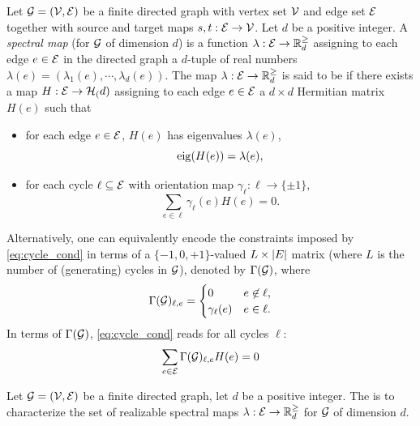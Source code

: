 \documentclass[notitlepage, 10pt]{article}
\begin{document}
\begin{defn}
    Let $\mathcal G = (\mathcal V, \mathcal E)$ be a finite directed graph with vertex set $\mathcal V$ and edge set $\mathcal E$ together with source and target maps $s, t : \mathcal E \to \mathcal V$.
    Let $d$ be a positive integer.
    A \textit{spectral map} (for $\mathcal G$ of dimension $d$) is a function $\lambda : \mathcal E \to \mathbb R^{\geq}_{d}$ assigning to each edge $e \in \mathcal E$ in the directed graph a $d$-tuple of real numbers $\lambda(e) = (\lambda_1(e), \cdots, \lambda_d(e))$.
    The map $\lambda : \mathcal E \to \mathbb R^{\geq}_{d}$ is said to be  if there exists a map $H : \mathcal E \to \mathcal H_{(}d)$ assigning to each edge $e \in \mathcal E$ a $d \times d$ Hermitian matrix $H(e)$ such that
    \begin{itemize}
        \item for each edge $e \in \mathcal E$, $H(e)$ has eigenvalues $\lambda(e)$, 
            \begin{equation}
                \label{eq:spec_cond}
                \operatorname{eig}(H(e)) = \lambda(e),
            \end{equation}
        \item for each cycle $\ell \subseteq \mathcal E$ with orientation map $\gamma_{\ell} : \ell \to \{\pm1\}$,
            \begin{equation}
                \label{eq:cycle_cond}
                \sum_{e \in \ell} \gamma_{\ell}(e)H(e) = 0.
            \end{equation}
    \end{itemize}
    Alternatively, one can equivalently encode the constraints imposed by \cref{eq:cycle_cond} in terms of a $\{-1, 0, +1\}$-valued $L \times \left|E\right|$ matrix (where $L$ is the number of (generating) cycles in $\mathcal G$), denoted by $\Gamma(\mathcal G)$, where
    \begin{equation}
        \Gamma(\mathcal G)_{\ell, e} 
        = \begin{cases}
            0 & e \not \in \ell, \\
            \gamma_{\ell}(e) & e \in \ell.
        \end{cases}
    \end{equation}
    In terms of $\Gamma(\mathcal G)$, \cref{eq:cycle_cond} reads for all cycles $\ell$:
    \begin{equation}
        \sum_{e \in \mathcal E} \Gamma(\mathcal G)_{\ell, e} H(e) = 0
    \end{equation}
\end{defn}

\begin{prob}
    \label{prob:ghp}
    Let $\mathcal G = (\mathcal V, \mathcal E)$ be a finite directed graph, let $d$ be a positive integer.
    The  is to characterize the set of realizable spectral maps $\lambda : \mathcal E \to \mathbb R^{\geq}_{d}$ for $\mathcal G$ of dimension $d$.
\end{prob}
\end{document}
